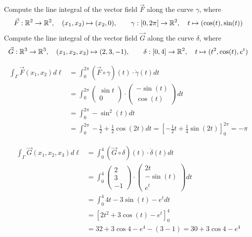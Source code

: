 \documentclass[11pt]{article}
\begin{document}


\begin{exercise}
    Compute the line integral of the vector field $\vec{F}$ along the curve $\gamma$, where 
    \begin{align*}
        \vec F : \mathbb{R}^2 \to \mathbb{R}^2, \quad (x_1,x_2) \mapsto ( x_2, 0 ), \qquad \gamma : [0,2\pi]  \to \mathbb{R}^2, \quad t \mapsto ( \cos(t), \sin(t) )
    \end{align*}
    Compute the line integral of the vector field $\vec{G}$ along the curve $\delta$, where 
    \begin{align*}
        \vec G : \mathbb{R}^3 \to \mathbb{R}^3, \quad (x_1,x_2,x_3) \mapsto ( 2, 3, -1 ), \qquad \delta : [0,4]  \to \mathbb{R}^2, \quad t \mapsto  ( t^2, \cos(t), e^t )
    \end{align*}
\end{exercise}
\begin{solution}
    \begin{align*}
        \int_{\Gamma} \vec{F}(x_1,x_2) d\ell 
        &= 
        \int_{0}^{2\pi} (\vec{F}\circ \gamma)(t)\cdot \dot{\gamma}(t)dt
        \\&= 
        \int_{0}^{2\pi} \begin{pmatrix}\sin t\\ 0\end{pmatrix}\cdot \begin{pmatrix} -\sin(t)\\ \cos(t)\end{pmatrix}dt
        \\&= 
        \int_{0}^{2\pi}  -\sin^2(t)dt
        \\&= 
        \int_{0}^{2\pi}  -\frac{1}{2}+\frac{1}{2}\cos(2t)dt
        = 
        \left[-\frac{1}{2}t + \frac{1}{4}\sin(2t)\right]_{0}^{2\pi} = -\pi
    \end{align*}

    \begin{align*}
        \int_{\Gamma} \vec{G}(x_1,x_2,x_3) d\ell &= \int_{0}^{4} (\vec{G}\circ \delta)(t)\cdot \dot{\delta}(t)dt
        \\&= \int_{0}^{4}\begin{pmatrix} 2\\ 3\\ -1\end{pmatrix} \cdot  \begin{pmatrix}2t\\ -\sin(t) \\ e^t \end{pmatrix}dt
        \\&= \int_{0}^{4} 4t - 3\sin(t) - e^t dt
        \\&= \left[2t^2 + 3\cos(t) - e^{t} \right]_{0}^{4}
        \\&= 32 + 3\cos4-e^4 - \left(3 - 1\right) = 30+3\cos4 -e^ 4
    \end{align*}
\end{solution}
\end{document}
